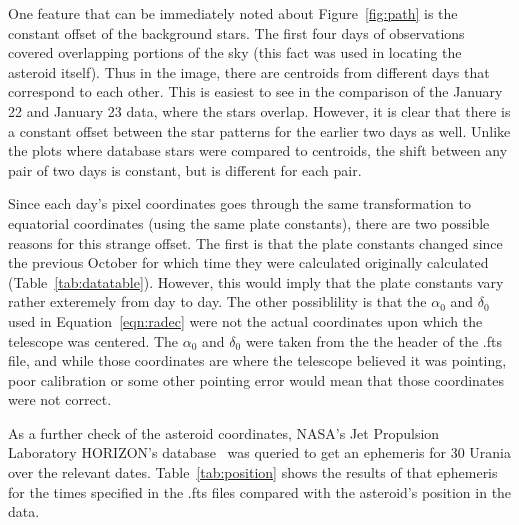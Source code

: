 \documentclass[a4paper,12pt]{article}
\begin{document}
One feature that can be immediately noted about Figure~\ref{fig:path} is the constant offset of the background stars. The first four days of observations covered overlapping portions of the sky (this fact was used in locating the asteroid itself). Thus in the image, there are centroids from different days that correspond to each other. This is easiest to see in the comparison of the January 22 and January 23 data, where the stars overlap. However, it is clear that there is a constant offset between the star patterns for the earlier two days as well. Unlike the plots where database stars were compared to centroids, the shift between any pair of two days is constant, but is different for each pair.

Since each day's pixel coordinates goes through the same transformation to equatorial coordinates (using the same plate constants), there are two possible reasons for this strange offset. The first is that the plate constants changed since the previous October for which time they were calculated originally calculated (Table~\ref{tab:datatable}). However, this would imply that the plate constants vary rather exteremely from day to day. The other possiblility is that the $\alpha_{0}$ and $\delta_{0}$ used in Equation~\ref{eqn:radec} were not the actual coordinates upon which the telescope was centered. The $\alpha_{0}$ and $\delta_{0}$ were taken from the the header of the .fts file, and while those coordinates are where the telescope believed it was pointing, poor calibration or some other pointing error would mean that those coordinates were not correct.

As a further check of the asteroid coordinates, NASA's Jet Propulsion Laboratory HORIZON's database~\citep{urania} was queried to get an ephemeris for 30 Urania over the relevant dates. Table~\ref{tab:position} shows the results of that ephemeris for the times specified in the .fts files compared with the asteroid's position in the data.
\end{document}
